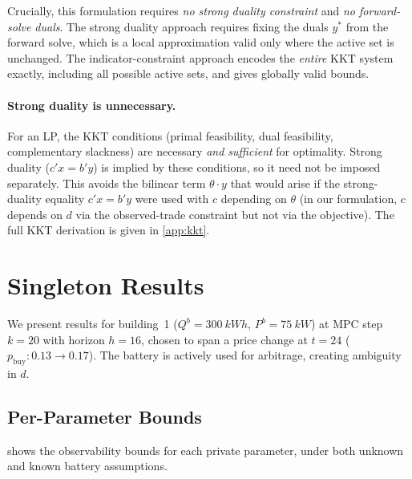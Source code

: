 \documentclass[11pt,a4paper]{article}
\newcommand{\pb}{p_{\text{buy}}}
\newcommand{\netload}{d}
\newcommand{\Qb}{{Q^b}}
\newcommand{\Pb}{{P^b}}
\begin{document}
Crucially, this formulation requires \emph{no strong duality constraint} and \emph{no forward-solve duals}. The strong duality approach requires fixing the duals $y^*$ from the forward solve, which is a local approximation valid only where the active set is unchanged. The indicator-constraint approach encodes the \emph{entire} KKT system exactly, including all possible active sets, and gives globally valid bounds.

\paragraph{Strong duality is unnecessary.}
For an LP, the KKT conditions (primal feasibility, dual feasibility, complementary slackness) are necessary \emph{and sufficient} for optimality. Strong duality ($c'x = b'y$) is implied by these conditions, so it need not be imposed separately. This avoids the bilinear term $\theta \cdot y$ that would arise if the strong-duality equality $c'x = b'y$ were used with $c$ depending on $\theta$ (in our formulation, $c$ depends on $\netload$ via the observed-trade constraint but not via the objective). The full KKT derivation is given in \cref{app:kkt}.

\section{Singleton Results}\label{sec:singleton}

We present results for building~1 ($\Qb = \SI{300}{kWh}$, $\Pb = \SI{75}{kW}$) at MPC step $k=20$ with horizon $h=16$, chosen to span a price change at $t=24$ ($\pb: 0.13 \to 0.17$). The battery is actively used for arbitrage, creating ambiguity in $\netload$.

\subsection{Per-Parameter Bounds}

 shows the observability bounds for each private parameter, under both unknown and known battery assumptions.
\end{document}
